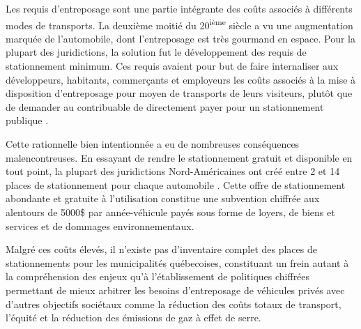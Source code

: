 
\label{sec:Introduction}  %

Les requis d'entreposage sont une partie intégrante des coûts associés à différents modes de transports. La deuxième moitié du 20\textsuperscript{ième} siècle a vu une augmentation marquée de l'automobile, dont l'entreposage est très gourmand en espace. Pour la plupart des juridictions, la solution fut le développement des requis de stationnement minimum. Ces requis avaient pour but de faire internaliser aux développeurs, habitants, commerçants et employeurs les coûts associés à la mise à disposition d'entreposage pour moyen de transports de leurs visiteurs, plutôt que de demander au contribuable de directement payer pour un stationnement publique \parencite{Shoup:HighCost:2005}.\par

Cette rationnelle bien intentionnée a eu de nombreuses conséquences malencontreuses. En essayant de rendre le stationnement gratuit et disponible en tout point, la plupart des juridictions Nord-Américaines ont créé entre 2 et 14 places de stationnement pour chaque automobile \parencite{Scharnhorst:QuantifiedParking:2018}. Cette offre de stationnement abondante et gratuite à l'utilisation constitue une subvention chiffrée aux alentours de 5000\$ par année-véhicule \parencite{Litman:ComprehensiveParking:2023} payés sous forme de loyers,  de biens et services et de dommages environnementaux.\par

Malgré ces coûts élevés, il n'existe pas d'inventaire complet des places de stationnements pour les municipalités québecoises, constituant un frein autant à la compréhension des enjeux qu'à l'établissement de politiques chiffrées permettant de mieux arbitrer les besoins d'entreposage de véhicules privés avec d'autres objectifs sociétaux comme la réduction des coûts totaux de transport, l'équité et la réduction des émissions de gaz à effet de serre. \par

